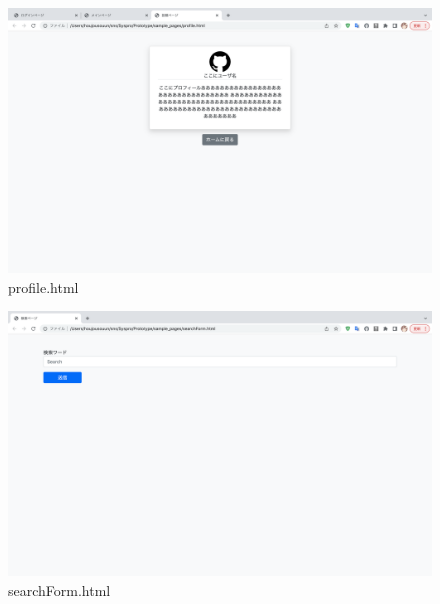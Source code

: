 \documentclass[dvipdfmx]{jsarticle}
\begin{document}
    \begin{figure}[H]
        \begin{center}
            \caption*{profile.html}
            \includegraphics[scale=0.3,clip]{pictures/profile.png}
        \end{center}
    \end{figure}

    \begin{figure}[H]
        \begin{center}
            \caption*{searchForm.html}
            \includegraphics[scale=0.3,clip]{pictures/searchForm.png}
        \end{center}
    \end{figure}
\end{document}
